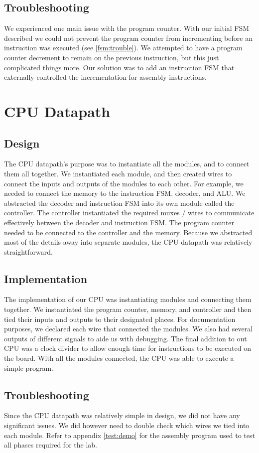 \documentclass[11pt]{article}
\begin{document}
\subsection{Troubleshooting}
We experienced one main issue with the program counter. With our initial FSM described  we could not prevent the program counter from incrementing before an instruction was executed (see \ref{fsm:trouble}). We attempted to have a program counter decrement to remain on the previous instruction, but this just complicated things more. Our solution was to add an instruction FSM that externally controlled the incrementation for assembly instructions. 

\section{CPU Datapath}
\subsection{Design}
The CPU datapath’s purpose was to instantiate all the modules, and to connect them all together. We instantiated each module, and then created wires to connect the inputs and outputs of the modules to each other. For example, we needed to connect the memory to the instruction FSM, decoder, and ALU. We abstracted the decoder and instruction FSM into its own module called the controller. The controller instantiated the required muxes / wires to communicate effectively between the decoder and instruction FSM.  The program counter needed to be connected to the controller and the memory. Because we abstracted most of the details away into separate modules, the CPU datapath was relatively straightforward. 

\subsection{Implementation}
The implementation of our CPU was instantiating modules and connecting them together. We instantiated the program counter, memory, and controller and then tied their inputs and outputs to their designated places. For documentation purposes, we declared each wire that connected the modules. We also had several outputs of different signals to aide us with debugging. The final addition to out CPU was a clock divider to allow enough time for instructions to be executed on the board. With all the modules connected, the CPU was able to execute a simple program.


\subsection{Troubleshooting}
Since the CPU datapath was relatively simple in design, we did not have any significant issues. We did however need to double check which wires we tied into each module. Refer to appendix \ref{test:demo} for the assembly program used to test all phases required for the lab. 
\end{document}
